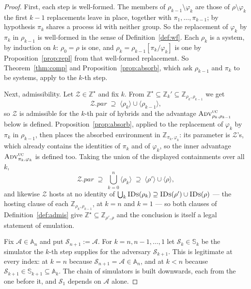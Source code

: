 \documentclass[11pt,a4paper]{article}
\newcommand{\pars}{\mathit{par}}
\newcommand{\Zenv}{\mathcal{Z}}
\newcommand{\Adv}{\mathcal{A}}
\newcommand{\Sim}{\mathcal{S}}
\newcommand{\advtg}{\op{Adv}}
\newcommand{\Aset}{\mathbb{A}}
\newcommand{\SimSet}{\mathbb{S}}
\newcommand{\ZenvSet}{\mathbb{Z}}
\newcommand{\op}[1]{\textsc{#1}}
\newcommand{\IDs}{\op{IDs}}
\newcommand{\ncl}[1]{\langle #1 \rangle}
\theoremstyle{accentdef}
\theoremstyle{accentplain}
\begin{document}
\begin{proof}
First, each step is well-formed. The members of $\rho_{k-1} \setminus \varphi_k$ are those of
$\rho \setminus \varphi_k$ the first $k-1$ replacements leave in place, together with
$\pi_1,\ldots,\pi_{k-1}$; by hypothesis $\pi_k$ shares a process id with neither group. So the
replacement of $\varphi_k$ by $\pi_k$ in $\rho_{k-1}$ is well-formed in the sense of
Definition~\ref{def:wf}. Each $\rho_k$ is a system, by induction on $k$: $\rho_0 = \rho$ is one,
and $\rho_k = \rho_{k-1}[\pi_k/\varphi_k]$ is one by Proposition~\ref{prop:repl} from that
well-formed replacement. So Theorem~\ref{thm:comp} and Proposition~\ref{prop:absorb}, which ask
$\rho_{k-1}$ and $\pi_k$ to be systems, apply to the $k$-th step.

Next, admissibility. Let $\Zenv \in \ZenvSet^{\star}$ and fix $k$. From $\ZenvSet^{\star} \subseteq \ZenvSet_k' \subseteq \ZenvSet_{\rho_k,\rho_{k-1}}$
we get
\[
  \Zenv.\pars \;\supseteq\; \ncl{\rho_k} \cup \ncl{\rho_{k-1}} ,
\]
so $\Zenv$ is admissible for the $k$-th pair of hybrids and the advantage
$\advtg^{\op{uc}}_{\rho_k,\rho_{k-1}}$ below is defined. Proposition~\ref{prop:absorb},
applied to the replacement of $\varphi_k$ by $\pi_k$ in $\rho_{k-1}$, then places the absorbed
environment in $\ZenvSet_{\pi_k,\varphi_k}$: its parameter is $\Zenv$'s, which already contains
the identities of $\pi_k$ and of $\varphi_k$, so the inner advantage
$\advtg^{\op{uc}}_{\pi_k,\varphi_k}$ is defined too. Taking the union of the displayed
containments over all $k$,
\[
  \Zenv.\pars \;\supseteq\; \bigcup_{k=0}^{n} \ncl{\rho_k} \;\supseteq\; \ncl{\rho'} \cup \ncl{\rho} ,
\]
and likewise $\Zenv$ hosts at no identity of $\bigcup_k \IDs(\rho_k) \supseteq \IDs(\rho') \cup \IDs(\rho)$
--- the hosting clause of each $\ZenvSet_{\rho_k,\rho_{k-1}}$, at $k = n$ and $k = 1$ ---
so both clauses of Definition~\ref{def:admis} give $\ZenvSet^{\star} \subseteq \ZenvSet_{\rho',\rho}$
and the conclusion is itself a legal
statement of emulation.

Fix $\Adv \in \Aset_n$ and put $\Sim_{n+1} := \Adv$. For $k = n, n-1, \ldots, 1$ let $\Sim_k \in \SimSet_k$
be the simulator the $k$-th step supplies for the adversary $\Sim_{k+1}$. This is legitimate at
every index: at $k = n$ because $\Sim_{n+1} = \Adv \in \Aset_n$, and at $k < n$ because
$\Sim_{k+1} \in \SimSet_{k+1} \subseteq \Aset_k$. The chain of simulators is built
downwards, each from the one before it, and $\Sim_1$ depends on $\Adv$ alone.


\end{proof}
\end{document}
